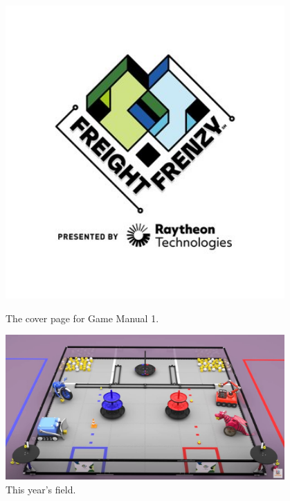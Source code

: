 \begin{figure}[ht]
\centering
\begin{minipage}[b]{.48\textwidth}
  \centering
  \includegraphics[width=0.95\textwidth]{Meetings/September/09-21-21/9-18-21_Team_Image1 - Nathan Forrer.jpg}
  \caption{The cover page for Game Manual 1.}
  \label{fig:pic1}
\end{minipage}%
\hfill%
\begin{minipage}[b]{.48\textwidth}
  \centering
  \includegraphics[width=0.95\textwidth]{Meetings/September/09-21-21/9-18-21_Team_Image2 - Nathan Forrer.jpg}
  \caption{This year's field.}
  \label{fig:pic2}
\end{minipage}
\end{figure}

